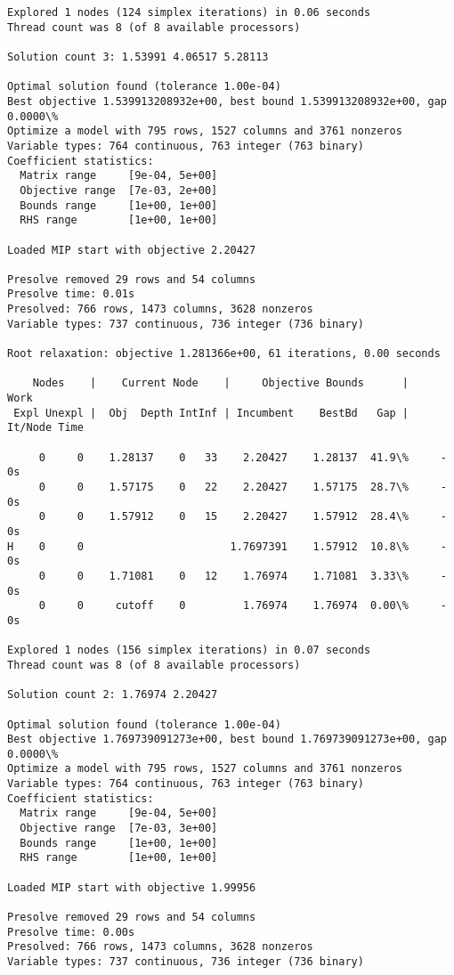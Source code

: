 \documentclass[11pt]{article}
\begin{document}
\begin{Verbatim}[commandchars=\\\{\}]
Explored 1 nodes (124 simplex iterations) in 0.06 seconds
Thread count was 8 (of 8 available processors)

Solution count 3: 1.53991 4.06517 5.28113 

Optimal solution found (tolerance 1.00e-04)
Best objective 1.539913208932e+00, best bound 1.539913208932e+00, gap 0.0000\%
Optimize a model with 795 rows, 1527 columns and 3761 nonzeros
Variable types: 764 continuous, 763 integer (763 binary)
Coefficient statistics:
  Matrix range     [9e-04, 5e+00]
  Objective range  [7e-03, 2e+00]
  Bounds range     [1e+00, 1e+00]
  RHS range        [1e+00, 1e+00]

Loaded MIP start with objective 2.20427

Presolve removed 29 rows and 54 columns
Presolve time: 0.01s
Presolved: 766 rows, 1473 columns, 3628 nonzeros
Variable types: 737 continuous, 736 integer (736 binary)

Root relaxation: objective 1.281366e+00, 61 iterations, 0.00 seconds

    Nodes    |    Current Node    |     Objective Bounds      |     Work
 Expl Unexpl |  Obj  Depth IntInf | Incumbent    BestBd   Gap | It/Node Time

     0     0    1.28137    0   33    2.20427    1.28137  41.9\%     -    0s
     0     0    1.57175    0   22    2.20427    1.57175  28.7\%     -    0s
     0     0    1.57912    0   15    2.20427    1.57912  28.4\%     -    0s
H    0     0                       1.7697391    1.57912  10.8\%     -    0s
     0     0    1.71081    0   12    1.76974    1.71081  3.33\%     -    0s
     0     0     cutoff    0         1.76974    1.76974  0.00\%     -    0s

Explored 1 nodes (156 simplex iterations) in 0.07 seconds
Thread count was 8 (of 8 available processors)

Solution count 2: 1.76974 2.20427 

Optimal solution found (tolerance 1.00e-04)
Best objective 1.769739091273e+00, best bound 1.769739091273e+00, gap 0.0000\%
Optimize a model with 795 rows, 1527 columns and 3761 nonzeros
Variable types: 764 continuous, 763 integer (763 binary)
Coefficient statistics:
  Matrix range     [9e-04, 5e+00]
  Objective range  [7e-03, 3e+00]
  Bounds range     [1e+00, 1e+00]
  RHS range        [1e+00, 1e+00]

Loaded MIP start with objective 1.99956

Presolve removed 29 rows and 54 columns
Presolve time: 0.00s
Presolved: 766 rows, 1473 columns, 3628 nonzeros
Variable types: 737 continuous, 736 integer (736 binary)


\end{Verbatim}
\end{document}
